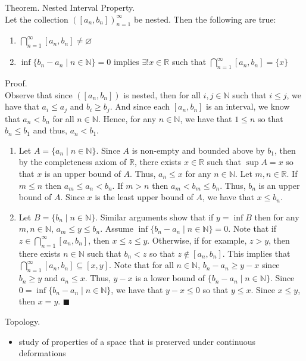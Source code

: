 \documentclass[twocolumn]{article}
\newcommand{\qed}{$\blacksquare$}
\newcommand{\br}{\vspace{\baselineskip}}
\let\emptyset\varnothing
\newcommand{\naturals}{\mathbb{N}}
\newcommand{\reals}{\mathbb{R}}
\begin{document}
Theorem. Nested Interval Property. \\
Let the collection $([a_n, b_n])_{n = 1}^\infty$ be nested. Then the following are true:
\begin{enumerate}
	\item
		$\bigcap_{n = 1}^\infty [a_n, b_n] \neq \emptyset$
	\item
		$\inf \{ b_n - a_n \mid n \in \naturals \} = 0$ implies $\exists! x \in \reals$ such that $\bigcap_{n = 1}^\infty [a_n, b_n] = \{ x \}$
\end{enumerate}
Proof. \\
Observe that since $([a_n, b_n])$ is nested, then for all $i, j \in \naturals$ such that $i \leq j$, we have that $a_i \leq a_j$ and $b_i \geq b_j$. And since each $[a_n, b_n]$ is an interval, we know that $a_n < b_n$ for all $n \in \naturals$. Hence, for any $n \in \naturals$, we have that $1 \leq n$ so that $b_n \leq b_1$ and thus, $a_n < b_1$.
\begin{enumerate}
	\item
		Let $A = \{ a_n \mid n \in \naturals \}$. Since $A$ is non-empty and bounded above by $b_1$, then by the completeness axiom of $\reals$, there exists $x \in \reals$ such that $\sup A = x$ so that $x$ is an upper bound of $A$. Thus, $a_n \leq x$ for any $n \in \naturals$. Let $m, n \in \reals$. If $m \leq n$ then $a_m \leq a_n < b_n$. If $m > n$ then $a_m < b_m \leq b_n$. Thus, $b_n$ is an upper bound of $A$. Since $x$ is the least upper bound of $A$, we have that $x \leq b_n$.
	\item
		Let $B = \{ b_n \mid n \in \naturals \}$. Similar arguments show that if $y = \inf B$ then for any $m, n \in \naturals$, $a_m \leq y \leq b_n$. Assume $\inf \{ b_n - a_n \mid n \in \naturals \} = 0$. Note that if $z \in \bigcap_{n = 1}^\infty [a_n, b_n]$, then $x \leq z \leq y$. Otherwise, if for example, $z > y$, then there exists $n \in \naturals$ such that $b_n < z$ so that $z \not\in [a_n, b_n]$. This implies that $\bigcap_{n = 1}^\infty [a_n, b_n] \subseteq [x, y]$. Note that for all $n \in \naturals$, $b_n - a_n \geq y - x$ since $b_n \geq y$ and $a_n \leq x$. Thus, $y - x$ is a lower bound of $\{ b_n - a_n \mid n \in \naturals \}$. Since $0 = \inf \{ b_n - a_n \mid n \in \naturals \}$, we have that $y - x \leq 0$ so that $y \leq x$. Since $x \leq y$, then $x = y$. \qed
\end{enumerate} \br

Topology.
\begin{itemize}
	\item
		study of properties of a space that is preserved under continuous deformations
\end{itemize} \br
\end{document}
